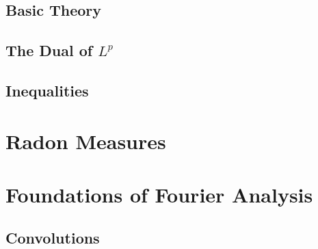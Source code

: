 \documentclass{article}
\theoremstyle{definition}
\begin{document}
\subsection{Basic Theory}
\subsection{The Dual of $ L^p $}
\subsection{Inequalities}
\section{Radon Measures}
\section{Foundations of Fourier Analysis}
\subsection{Convolutions}
\newpage
{} 
\end{document}
